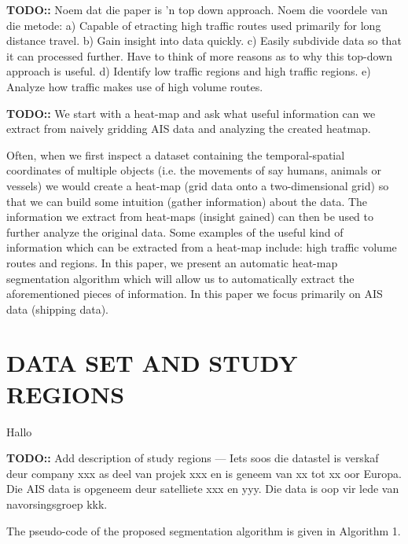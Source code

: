 \documentclass{article}
\begin{document}
\textbf{TODO::} Noem dat die paper is 'n top down approach. Noem die voordele van die metode:
a) Capable of etracting high traffic routes used primarily for long distance travel. b) Gain insight into data quickly. c) Easily subdivide data so that it can processed
further. Have to think of more reasons as to why this top-down approach is useful. d) Identify low traffic regions and high traffic regions. e) Analyze how traffic makes 
use of high volume routes.

\textbf{TODO::} We start with a heat-map and ask what useful information can we extract from naively gridding AIS data and analyzing the created heatmap.

Often, when we first inspect a dataset containing the temporal-spatial coordinates of multiple objects (i.e. the movements of say humans, animals or vessels)
we would create a heat-map (grid data onto a two-dimensional grid) so that we can build some intuition (gather information) about the data.
The information we extract from heat-maps (insight gained) can then be used to further analyze the original data. Some examples of the useful kind of information which can be extracted from a 
heat-map include: high traffic volume routes and regions. In this paper, we present an automatic heat-map segmentation algorithm which will allow us to automatically extract the 
 aforementioned pieces of information. In this paper we focus primarily on AIS data (shipping data). 
 
\section{DATA SET AND STUDY REGIONS}

Hallo

\textbf{TODO::} Add description of study regions --- Iets soos die datastel is verskaf deur company xxx as deel van projek xxx en is geneem van xx tot xx oor Europa. Die AIS data is opgeneem deur satelliete xxx en yyy. Die data is oop vir lede van navorsingsgroep kkk.
 
The pseudo-code of the proposed segmentation algorithm is given in Algorithm 1. 
\end{document}

